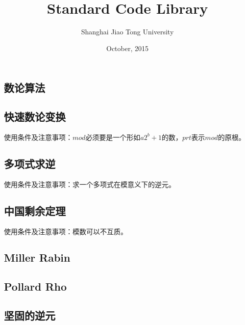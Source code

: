 \documentclass[landscape, oneside, a4paper, cs4size]{book}
\begin{document}
\scriptsize
	\title{\textbf{\LARGE{Standard Code Library}}}
	\author{Shanghai Jiao Tong University}
	\date{October, 2015}
	\maketitle
	\newpage
	\begin{multicols}{2}
		\tableofcontents
		\chapter{数论算法}
			\section{快速数论变换}
			\begin{spacing}{0.8}
				使用条件及注意事项：$mod$必须要是一个形如$a2^b + 1$的数，$prt$表示$mod$的原根。
				
			\end{spacing}
			\section{多项式求逆}
			\begin{spacing}{0.8}
				使用条件及注意事项：求一个多项式在模意义下的逆元。
				
			\end{spacing}
			\section{中国剩余定理}
			\begin{spacing}{0.8}
				使用条件及注意事项：模数可以不互质。
				
			\end{spacing}
			\section{Miller Rabin}
			\begin{spacing}{0.8}
				
			\end{spacing}
			\section{Pollard Rho}
			\begin{spacing}{0.8}
				
			\end{spacing}
			\section{坚固的逆元}
			\begin{spacing}{0.8}
				
			\end{spacing}

\end{multicols}
\end{document}
